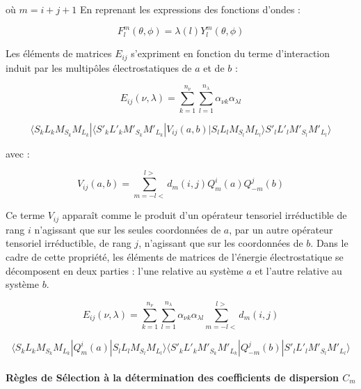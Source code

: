 où $m= i+j+1$ 
En reprenant les expressions des fonctions d'ondes :
	
\begin{equation}
F_{l}^{m} (\theta,\phi) = \lambda (l)Y_{l}^{m} (\theta,\phi)
\end{equation}
		
Les éléments de matrices $E_{ij}$ s'expriment en fonction du terme d'interaction induit par les multipôles électrostatiques de $a$ et de $b$ : 
	
\begin{equation*}
E_{ij} (\nu , \lambda) = \sum_{k=1}^{n_{\nu}} \sum_{l=1}^{n_{\lambda}} \alpha_{\nu k} \alpha_{\lambda l}
\end{equation*}
	
\begin{equation}
\langle S_{k}L_{k}M_{S_{k}}M_{L_{k}}|\langle S'_{k}L'_{k}M'_{S_{k}}M'_{L_{k}}| V_{ij}(a,b)| S_{l}L_{l}M_{S_{l}} M_{L_{l}} \rangle S'_{l}L'_{l}M'_{S_{l}}M'_{L_{l}} \rangle
\end{equation}
	
avec : 
	
\begin{equation}
V_{ij}(a,b) = \sum_{m=-l<}^{l>} d_{m}(i,j) Q_{m}^{i}(a) Q_{-m}^{j}(b) 
\end{equation}
		
Ce terme $V_{ij}$ apparaît comme le produit d'un opérateur tensoriel irréductible de rang $i$ n'agissant que sur les seules coordonnées de $a$, par un autre opérateur tensoriel irréductible, de rang $j$, n'agissant que sur les coordonnées de $b$. Dans le cadre de cette propriété, les éléments de matrices de l'énergie électrostatique se décomposent en deux parties : l'une relative au système $a$ et l'autre relative au système $b$. 
	
\begin{equation*}
E_{ij}(\nu , \lambda)= \sum_{k=1}^{n_{\nu}} \sum_{l=1}^{n_{\lambda}} \alpha_{\nu k} \alpha_{\lambda l} \sum_{m=-l<}^{l>} d_{m}(i,j)
\end{equation*}
	
\begin{equation}
\langle S_{k}L_{k}M_{S_{k}}M_{L_{k}}| Q_{m}^{i} (a)| S_{l}L_{l}M_{S_{l}}M_{L_{l}}\rangle \langle S'_{k}L'_{k}M'_{S_{k}}M'_{L_{k}}| Q_{-m}^{j} (b) | S'_{l}L'_{l}M'_{S_{l}}M'_{L_{l}}\rangle
\end{equation}

\paragraph{Règles de Sélection à la détermination des coefficients de dispersion $C_{m}$}

